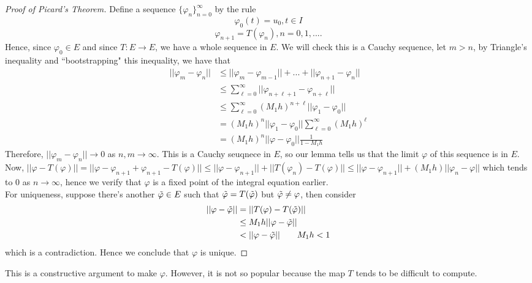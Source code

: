 \documentclass{article}
\begin{document}
\begin{proof}[Proof of Picard's Theorem]
    Define a sequence $\{\varphi_n\}_{n=0}^\infty$ by the rule
    \[\varphi_0(t) = u_0, t \in I\]
    \[\varphi_{n+1} = T(\varphi_n), n = 0, 1, ....\]
    Hence, since $\varphi_0 \in E$ and since $T: E \to E$, we have a whole sequence in $E$. We will check this is a Cauchy sequence, let $m > n$, by Triangle's inequality and ``bootstrapping" this inequality, we have that
    \begin{align*}
        ||\varphi_m - \varphi_n|| &\leq ||\varphi_{m} - \varphi_{m-1}|| + ... + ||\varphi_{n+1} - \varphi_n||\\
        &\leq \sum_{\ell = 0}^\infty ||\varphi_{n + \ell + 1} - \varphi_{n + \ell}|| \\
        &\leq \sum_{\ell = 0}^\infty (M_1 h)^{n+\ell} ||\varphi_1 - \varphi_0||  \tag*{Using $(*)$}\\
        &= (M_1 h)^n  ||\varphi_1 - \varphi_0|| \sum_{\ell = 0}^\infty (M_1 h)^{\ell}\\
        &= (M_1 h)^n ||\varphi - \varphi_0|| \frac{1}{1 - M_1 h}
    \end{align*}
    Therefore, $||\varphi_m - \varphi_n|| \to 0$ as $n, m \to \infty$. This is a Cauchy seuqnece in $E$, so our lemma tells us that the limit $\varphi$ of this sequence is in $E$.\\

    Now, $||\varphi - T(\varphi)|| = ||\varphi - \varphi_{n+1} + \varphi_{n+1} - T(\varphi)|| \leq ||\varphi - \varphi_{n+1}|| + ||T(\varphi_n) - T(\varphi)|| \leq ||\varphi - \varphi_{n+1}|| + (M_1 h)||\varphi_n - \varphi||$ which tends to $0$ as $n \to \infty$, hence we verify that $\varphi$ is a fixed point of the integral equation earlier.\\

    For uniqueness, suppose there's another $\Tilde{\varphi} \in E$ such that $\Tilde{\varphi} = T(\Tilde{\varphi})$ but $\Tilde{\varphi} \neq \varphi$, then consider
    \begin{align*}
        ||\varphi - \Tilde{\varphi}|| &= ||T(\varphi) - T(\Tilde{\varphi})||\\
        &\leq M_1 h ||\varphi - \Tilde{\varphi}||\\
        &< ||\varphi - \Tilde{\varphi}|| \tag*{$M_1 h < 1$}
    \end{align*}
    which is a contradiction. Hence we conclude that $\varphi$ is unique.
\end{proof}

\begin{remark}
    This is a constructive argument to make $\varphi$. However, it is not so popular because the map $T$ tends to be difficult to compute.
\end{remark}
\end{document}
